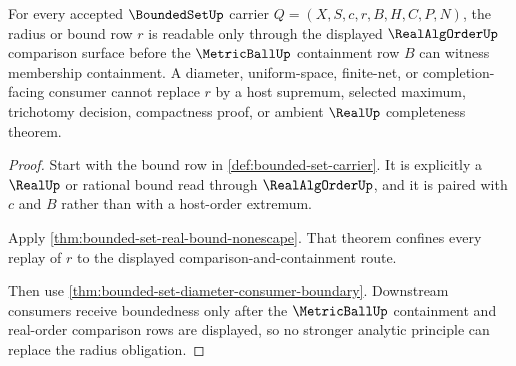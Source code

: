 \begin{theorem}
\label{thm:boundedset-real-order-radius-obligation}
For every accepted $\BoundedSetUp$ carrier $Q=(X,S,c,r,B,H,C,P,N)$, the radius or bound row $r$ is readable only through the displayed $\RealAlgOrderUp$ comparison surface before the $\MetricBallUp$ containment row $B$ can witness membership containment. A diameter, uniform-space, finite-net, or completion-facing consumer cannot replace $r$ by a host supremum, selected maximum, trichotomy decision, compactness proof, or ambient $\RealUp$ completeness theorem.
\end{theorem}
\begin{proof}
Start with the bound row in \autoref{def:bounded-set-carrier}. It is explicitly a $\RealUp$ or rational bound read through $\RealAlgOrderUp$, and it is paired with $c$ and $B$ rather than with a host-order extremum.

Apply \autoref{thm:bounded-set-real-bound-nonescape}. That theorem confines every replay of $r$ to the displayed comparison-and-containment route.

Then use \autoref{thm:bounded-set-diameter-consumer-boundary}. Downstream consumers receive boundedness only after the $\MetricBallUp$ containment and real-order comparison rows are displayed, so no stronger analytic principle can replace the radius obligation.
\end{proof}

